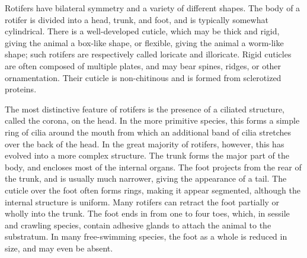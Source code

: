 \documentclass[]{book}
\begin{document}
Rotifers have bilateral symmetry and a variety of different shapes. The body of a rotifer is divided into a head, trunk, and foot, and is typically somewhat cylindrical. There is a well-developed cuticle, which may be thick and rigid, giving the animal a box-like shape, or flexible, giving the animal a worm-like shape; such rotifers are respectively called loricate and illoricate. Rigid cuticles are often composed of multiple plates, and may bear spines, ridges, or other ornamentation. Their cuticle is non-chitinous and is formed from sclerotized proteins.

The most distinctive feature of rotifers is the presence of a ciliated structure, called the corona, on the head. In the more primitive species, this forms a simple ring of cilia around the mouth from which an additional band of cilia stretches over the back of the head. In the great majority of rotifers, however, this has evolved into a more complex structure.
The trunk forms the major part of the body, and encloses most of the internal organs. The foot projects from the rear of the trunk, and is usually much narrower, giving the appearance of a tail. The cuticle over the foot often forms rings, making it appear segmented, although the internal structure is uniform. Many rotifers can retract the foot partially or wholly into the trunk. The foot ends in from one to four toes, which, in sessile and crawling species, contain adhesive glands to attach the animal to the substratum. In many free-swimming species, the foot as a whole is reduced in size, and may even be absent.
\end{document}
